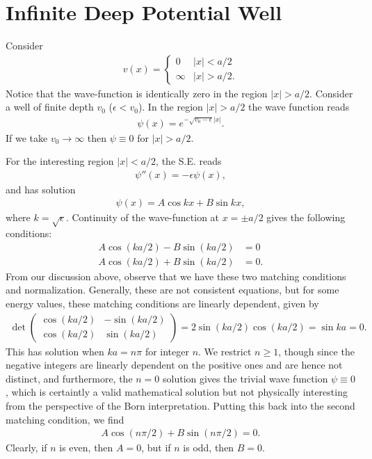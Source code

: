 \section{Infinite Deep Potential Well}

Consider 
\begin{eqnarray}
    v(x) = \begin{cases}
        0 & |x| < a/2 \\
        \infty & |x| > a/2
    .\end{cases}
\end{eqnarray}
Notice that the wave-function is identically zero in the region $|x| > a/2$.
Consider a well of finite depth $v_0$ ($\epsilon < v_0$).
In the region $|x| > a/2$ the wave function reads
\begin{eqnarray}
    \psi(x) = e^{- \sqrt{v_0 - \epsilon} |x|}
.\end{eqnarray}
If we take $v_0 \rightarrow \infty$ then $\psi \equiv 0$ for $|x| > a/2$.

For the interesting region $|x| < a/2$, the S.E. reads
\begin{eqnarray}
    \psi''(x) = -\epsilon \psi(x)
,\end{eqnarray}
and has solution
\begin{eqnarray}
    \psi(x) = A \cos{k x} + B \sin{k x}
,\end{eqnarray}
where $k = \sqrt{\epsilon}$.
Continuity of the wave-function at $x = \pm a/2$ gives the following conditions:
\begin{align}
    A \cos(ka/2) - B \sin(ka/2) &= 0 \\
    A \cos(ka/2) + B \sin(ka/2) &= 0
.\end{align}
From our discussion above, observe that we have these two matching conditions and normalization.
Generally, these are not consistent equations, but for some energy values, these matching conditions are linearly dependent, given by
\begin{eqnarray}
    \det \begin{pmatrix}
        \cos(ka/2) & -\sin(ka/2) \\
        \cos(ka/2) & \sin(ka/2)
    \end{pmatrix} = 2 \sin(ka/2) \cos(ka/2) = \sin{ka} = 0
.\end{eqnarray}
This has solution when $ka = n \pi$ for integer $n$.
We restrict $n \geq 1$, though since the negative integers are linearly dependent on the positive ones and are hence not distinct, and furthermore, the $n = 0$ solution gives the trivial wave function $\psi \equiv 0$, which is certaintly a valid mathematical solution but not physically interesting from the perspective of the Born interpretation.
Putting this back into the second matching condition, we find
\begin{eqnarray}
    A \cos(n\pi/2) + B \sin(n \pi/2) = 0
.\end{eqnarray}
Clearly, if $n$ is even, then $A = 0$, but if $n$ is odd, then $B = 0$.

